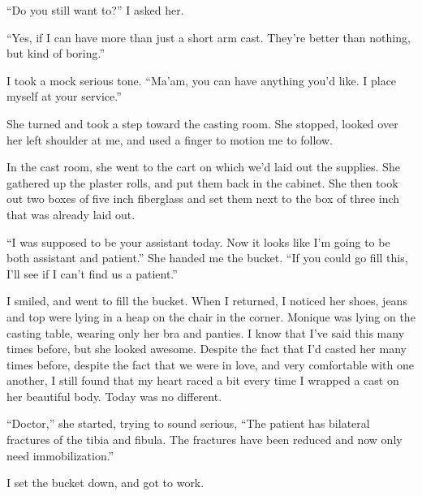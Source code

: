 ``Do you still want to?'' I asked her.

``Yes, if I can have more than just a short arm cast. They're better than nothing, but kind
of boring.''

I took a mock serious tone. ``Ma'am, you can have anything you'd like. I place myself at
your service.''

She turned and took a step toward the casting room. She stopped, looked over her left
shoulder at me, and used a finger to motion me to follow.

In the cast room, she went to the cart on which we'd laid out the supplies. She gathered up
the plaster rolls, and put them back in the cabinet. She then took out two boxes of five inch
fiberglass and set them next to the box of three inch that was already laid out.

``I was supposed to be your assistant today. Now it looks like I'm going to be both
assistant and patient.'' She handed me the bucket. ``If you could go fill this, I'll see if I
can't find us a patient.''

I smiled, and went to fill the bucket. When I returned, I noticed her shoes, jeans and top
were lying in a heap on the chair in the corner. Monique was lying on the casting table, wearing
only her bra and panties. I know that I've said this many times before, but she looked awesome.
Despite the fact that I'd casted her many times before, despite the fact that we were in love,
and very comfortable with one another, I still found that my heart raced a bit every time I
wrapped a cast on her beautiful body. Today was no different.

``Doctor,'' she started, trying to sound serious, ``The patient has bilateral fractures of the
tibia and fibula. The fractures have been reduced and now only need immobilization.''

I set the bucket down, and got to work.

